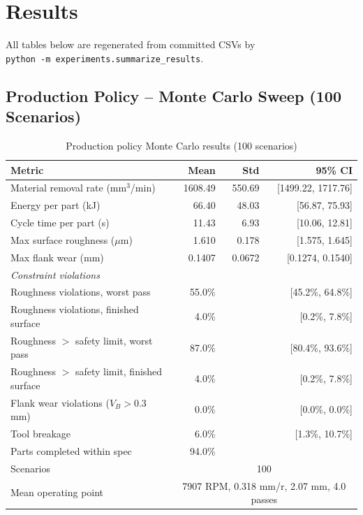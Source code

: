 \documentclass[11pt,a4paper]{article}
\newcommand{\VB}{V_B}
\begin{document}
\section{Results}

All tables below are regenerated from committed CSVs by\\
\texttt{python -m experiments.summarize\_results}.

\subsection{Production Policy -- Monte Carlo Sweep (100 Scenarios)}
\label{sec:mc}

\begin{table}[H]
\centering
\caption{Production policy Monte Carlo results (100 scenarios)}
\label{tab:mc}
\begin{tabular}{@{}lrrr@{}}
\toprule
\textbf{Metric} & \textbf{Mean} & \textbf{Std} & \textbf{95\% CI} \\
\midrule
Material removal rate (mm$^3$/min) & 1608.49 & 550.69 & [1499.22, 1717.76] \\
Energy per part (kJ) & 66.40 & 48.03 & [56.87, 75.93] \\
Cycle time per part (s) & 11.43 & 6.93 & [10.06, 12.81] \\
Max surface roughness ($\mu$m) & 1.610 & 0.178 & [1.575, 1.645] \\
Max flank wear (mm) & 0.1407 & 0.0672 & [0.1274, 0.1540] \\
\multicolumn{4}{l}{\textit{Constraint violations}} \\
Roughness violations, worst pass & 55.0\% & & [45.2\%, 64.8\%] \\
Roughness violations, finished surface & 4.0\% & & [0.2\%, 7.8\%] \\
Roughness $>$ safety limit, worst pass & 87.0\% & & [80.4\%, 93.6\%] \\
Roughness $>$ safety limit, finished surface & 4.0\% & & [0.2\%, 7.8\%] \\
Flank wear violations ($\VB > 0.3$ mm) & 0.0\% & & [0.0\%, 0.0\%] \\
Tool breakage & 6.0\% & & [1.3\%, 10.7\%] \\
Parts completed within spec & 94.0\% & & \\
\midrule
Scenarios & \multicolumn{3}{c}{100} \\
Mean operating point & \multicolumn{3}{c}{7907 RPM, 0.318 mm/r, 2.07 mm, 4.0 passes} \\
\bottomrule
\end{tabular}
\end{table}
\end{document}
